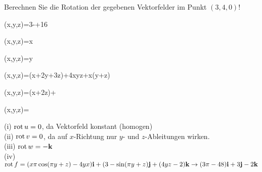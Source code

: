 \begin{atiTask}[
  title = Rotation berechnen
]
Berechnen Sie die Rotation der gegebenen Vektorfelder im Punkt $(3,4,0)$!
\begin{atiSubequations}
\item{(x,y,z)=3-\pi {}+16}
\item{(x,y,z)=x}
\item{(x,y,z)=y}
\item{(x,y,z)=(x+2y+3z)+4xyz+x\sin(\pi y+z)}
\item{(x,y,z)=\ln (x+2z)+}
\item{(x,y,z)=}
\end{atiSubequations}

\end{atiTask}
\begin{atiSolution}
(i) $\operatorname{rot} u=0$, da Vektorfeld konstant (homogen)\\
(ii) $\operatorname{rot} v=0 $, da auf $x$-Richtung nur $y$- und $z$-Ableitungen wirken.\\
(iii) $\operatorname{rot} w=-\mathbf{k}$\\
(iv) $\operatorname{rot} f=(x\pi\cos (\pi y+z)-4yx)\mathbf{i}+(3-\sin(\pi y+z)\mathbf{j}+(4yz-2)\mathbf{k}\rightarrow (3\pi-48)\mathbf{i}+3\mathbf{j}-2\mathbf{k}$
\end{atiSolution}